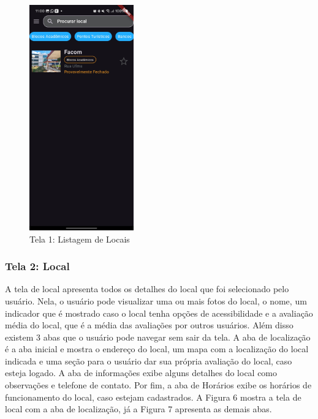     \begin{figure}[h]
        \centering
        \includegraphics[width=0.4\textwidth]{imagens/inicial.jpg}
        \caption{\scriptsize Tela 1: Listagem de Locais}
        \label{fig:tela1}
    \end{figure}

    \FloatBarrier

\subsubsection{Tela 2: Local}

    A tela de local apresenta todos os detalhes do local que foi selecionado pelo usuário. Nela, o usuário pode visualizar uma ou mais fotos do local, o nome, um indicador que é mostrado caso o local tenha opções de acessibilidade e a avaliação média do local, que é a média das avaliações por outros usuários. Além disso existem 3 abas que o usuário pode navegar sem sair da tela. A aba de localização é a aba inicial e mostra o endereço do local, um mapa com a localização do local indicada e uma seção para o usuário dar sua própria avaliação do local, caso esteja logado. A aba de informações exibe alguns detalhes do local como observações e telefone de contato. Por fim, a aba de Horários exibe os horários de funcionamento do local, caso estejam cadastrados. A Figura 6 mostra a tela de local com a aba de localização, já a Figura 7 apresenta as demais abas.

